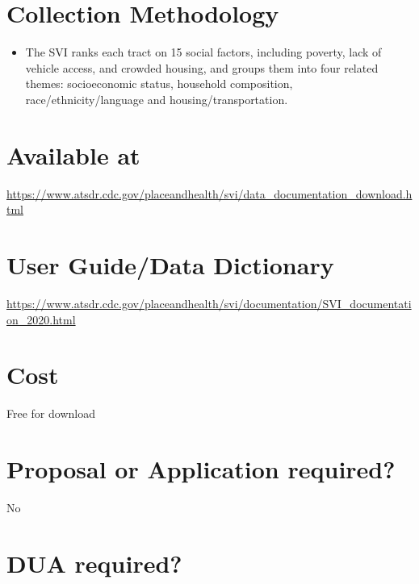 \documentclass[
]{book}
\providecommand{\tightlist}{%
  \setlength{\itemsep}{0pt}\setlength{\parskip}{0pt}}
\begin{document}
\hypertarget{collection-methodology-82}{%
\section{Collection Methodology}\label{collection-methodology-82}}

\begin{itemize}
\tightlist
\item
  The SVI ranks each tract on 15 social factors, including poverty, lack of vehicle access, and crowded housing, and groups them into four related themes: socioeconomic status, household composition, race/ethnicity/language and housing/transportation.
\end{itemize}

\hypertarget{available-at-82}{%
\section{Available at}\label{available-at-82}}

\url{https://www.atsdr.cdc.gov/placeandhealth/svi/data_documentation_download.html}

\hypertarget{user-guidedata-dictionary-82}{%
\section{User Guide/Data Dictionary}\label{user-guidedata-dictionary-82}}

\url{https://www.atsdr.cdc.gov/placeandhealth/svi/documentation/SVI_documentation_2020.html}

\hypertarget{cost-82}{%
\section{Cost}\label{cost-82}}

Free for download

\hypertarget{proposal-or-application-required-82}{%
\section{Proposal or Application required?}\label{proposal-or-application-required-82}}

No

\hypertarget{dua-required-82}{%
\section{DUA required?}\label{dua-required-82}}
\end{document}
